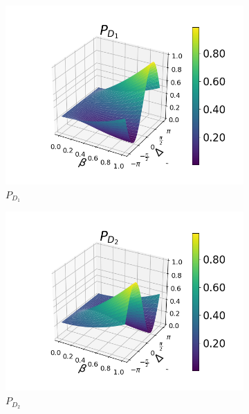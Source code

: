 \documentclass[12pt]{book}
\begin{document}
\begin{figure}[H]
\centering
\begin{subfigure}[b]{0.40\linewidth}
\includegraphics[width=\linewidth]{images/pd1_2.png}
\caption{$P_{D_{1}}$}
\end{subfigure}
\begin{subfigure}[b]{0.40\linewidth}
\includegraphics[width=\linewidth]{images/pd2_2.png}
\caption{$P_{D_{2}}$ }
\label{fig:BS1}
\end{subfigure}
\begin{subfigure}[b]{0.40\linewidth}

\end{subfigure}
\end{figure}
\end{document}
